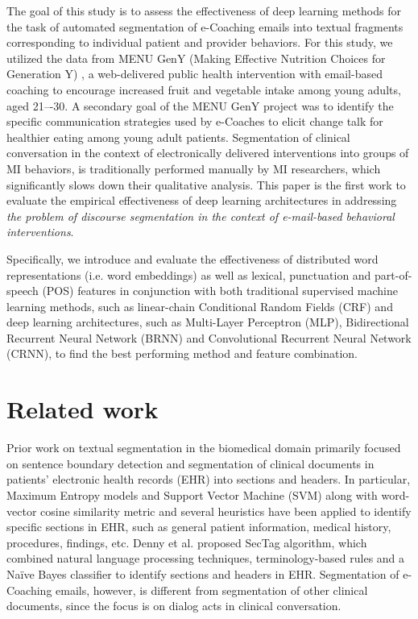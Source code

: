 \documentclass{amia}
\begin{document}
The goal of this study is to assess the effectiveness of deep learning methods for the task of automated segmentation of e-Coaching emails into textual fragments corresponding to individual patient and provider behaviors.  For this study, we utilized the data from MENU GenY (Making Effective Nutrition Choices for Generation Y) \cite{alexander2017motivations}, a web-delivered public health intervention with email-based coaching to encourage increased fruit and vegetable intake among young adults, aged 21–-30. A secondary goal of the MENU GenY project was to identify the specific communication strategies used by e-Coaches to elicit change talk for healthier eating among young adult patients. Segmentation of clinical conversation in the context of electronically delivered interventions into groups of MI behaviors, is traditionally performed manually by MI researchers, which significantly slows down their qualitative analysis. This paper is the first work to evaluate the empirical effectiveness of deep learning architectures in addressing \textit{the problem of discourse segmentation in the context of e-mail-based behavioral interventions}. 

Specifically, we introduce and evaluate the effectiveness of distributed word representations (i.e. word embeddings) as well as lexical, punctuation and part-of-speech (POS) features in conjunction with both traditional supervised machine learning methods, such as linear-chain Conditional Random Fields (CRF)\cite{lafferty2001conditional} and deep learning architectures, such as Multi-Layer Perceptron (MLP),\cite{rumelhart1986learning} Bidirectional Recurrent Neural Network (BRNN)\cite{schuster1997bidirectional} and Convolutional Recurrent Neural Network (CRNN),\cite{treviso2017sentence} to find the best performing method and feature combination. 

\section*{Related work}

Prior work on textual segmentation in the biomedical domain primarily focused on sentence boundary detection \cite{griffis2016quantitative,kreuzthaler2015detection,treviso2017sentence} and segmentation of clinical documents in patients' electronic health records (EHR) into sections and headers. \cite{apostolova2009automatic,denny2009evaluation,tepper2012statistical,cho2002text} In particular, Maximum Entropy models \cite{tepper2012statistical} and Support Vector Machine (SVM) along with word-vector cosine similarity metric and several heuristics \cite{apostolova2009automatic} have been applied to identify specific sections in EHR, such as general patient information, medical history, procedures, findings, etc. Denny et al. \cite{denny2009evaluation} proposed SecTag algorithm, which combined natural language processing techniques, terminology-based rules and a Na\"{i}ve Bayes classifier to identify sections and headers in EHR. Segmentation of e-Coaching emails, however, is different from segmentation of other clinical documents, since the focus is on dialog acts in clinical conversation.   
\end{document}

